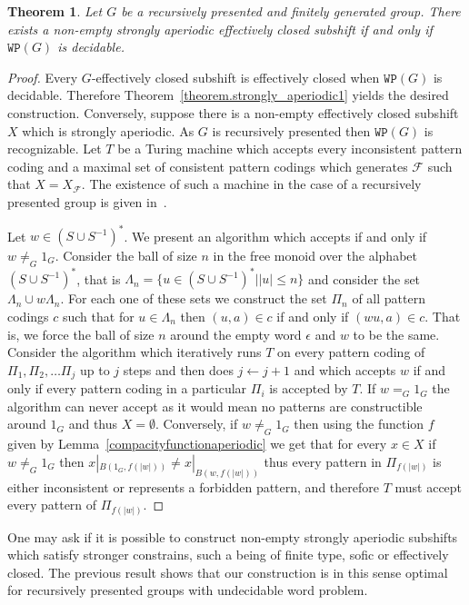\documentclass[letterpaper]{article}
\theoremstyle{plain}
\newtheorem{theorem}{Theorem}[section]
\def\FF{\mathcal{F}}
\begin{document}
		\begin{theorem}
			Let $G$ be a recursively presented and finitely generated group. There exists a non-empty strongly aperiodic effectively closed subshift if and only if $\texttt{WP}(G)$ is decidable.
		\end{theorem}
		
		\begin{proof}
			Every $G$-effectively closed subshift is effectively closed when $\texttt{WP}(G)$ is decidable. Therefore Theorem~\ref{theorem.strongly_aperiodic1} yields the desired construction. Conversely, suppose there is a non-empty effectively closed subshift $X$ which is strongly aperiodic. As $G$ is recursively presented then $\texttt{WP}(G)$ is recognizable. Let $T$ be a Turing machine which accepts every inconsistent pattern coding and a maximal set of consistent pattern codings which generates $\FF$ such that $X = X_{\FF}$. The existence of such a machine in the case of a recursively presented group is given in~\cite{ABS2014}. 
			
			Let $w \in (S \cup S^{-1})^*$. We present an algorithm which accepts if and only if $w \neq_G 1_G$. Consider the ball of size $n$ in the free monoid over the alphabet $(S \cup S^{-1})^*$, that is $\Lambda_n = \{u \in (S \cup S^{-1})^*| |u| \leq n \}$ and consider the set $\Lambda_n \cup w\Lambda_n$. For each one of these sets we construct the set $\Pi_n$ of all pattern codings $c$ such that for $u \in \Lambda_n$ then $(u,a) \in c$ if and only if $(wu,a) \in c$. That is, we force the ball of size $n$ around the empty word $\epsilon$ and $w$ to be the same. Consider the algorithm which iteratively runs $T$ on every pattern coding of $\Pi_1, \Pi_2, \dots \Pi_j$ up to $j$ steps and then does $j \leftarrow j+1$ and which accepts $w$ if and only if every pattern coding in a particular $\Pi_i$ is accepted by $T$. If $w =_G 1_G$ the algorithm can never accept as it would mean no patterns are constructible around $1_G$ and thus $X = \emptyset$. Conversely, if $w \neq_G 1_G$ then using the function $f$ given by 
			Lemma~\ref{compacityfunctionaperiodic} we get that for every $x \in X$ if $w \neq_G 1_G$ then $x|_{B(1_G,f(|w|))} \neq x|_{B(w,f(|w|))}$ thus every pattern in $\Pi_{f(|w|)}$ is either inconsistent or represents a forbidden pattern, and therefore $T$ must accept every pattern of $\Pi_{f(|w|)}$. \end{proof}
		
		One may ask if it is possible to construct non-empty strongly aperiodic subshifts which satisfy stronger constrains, such a being of finite type, sofic or effectively closed. The previous result shows that our construction is in this sense optimal for recursively presented groups with undecidable word problem.
	
\end{document}
